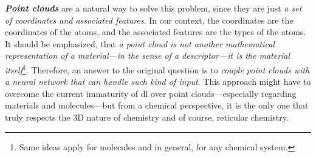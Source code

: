 \emph{\textbf{Point clouds}} \parencite{Qi2016, Bello2020}
are a natural way to solve this problem, since they are just \emph{a set of
coordinates and associated features}. In our context, the
coordinates are the coordinates of the atoms, and the associated features are
the types of the atoms. It should be emphasized, that \emph{a point cloud is not
another mathematical representation of a material---in the
sense of a descriptor---it is the material
itself}\footnote{Same ideas apply for molecules and in general, for any chemical
system.}. Therefore, an answer to the original question
is to \emph{couple point clouds with a neural network that can handle such kind
of input}. This approach might have to overcome the current immaturity of
\gls{dl} over point clouds---especially regarding materials and molecules---but
from a chemical perspective, it is the only one that truly respects the 3D
nature of chemistry and of course, reticular
chemistry.
